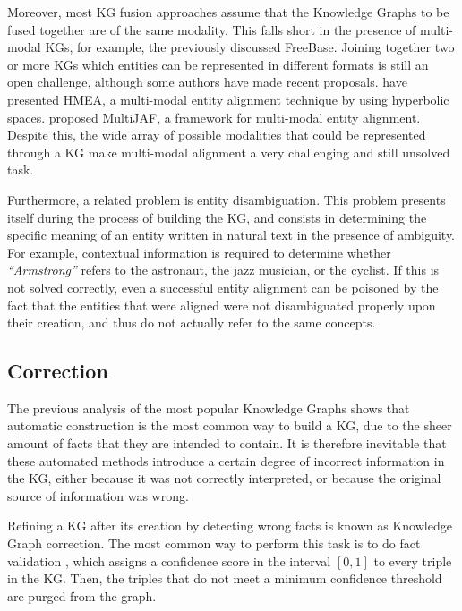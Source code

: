 Moreover, most KG fusion approaches assume that the Knowledge Graphs to be fused together are of the same modality. This falls short in the presence of multi-modal KGs, for example, the previously discussed FreeBase. Joining together two or more KGs which entities can be represented in different formats is still an open challenge, although some authors have made recent proposals. \citet{guo2021} have presented HMEA, a multi-modal entity alignment technique by using hyperbolic spaces. \citet{cheng2022} proposed MultiJAF, a framework for multi-modal entity alignment. Despite this, the wide array of possible modalities that could be represented through a KG make multi-modal alignment a very challenging and still unsolved task.

Furthermore, a related problem is entity disambiguation. This problem presents itself during the process of building the KG, and consists in determining the specific meaning of an entity written in natural text in the presence of ambiguity. For example, contextual information is required to determine whether \textit{``Armstrong''} refers to the astronaut, the jazz musician, or the cyclist. If this is not solved correctly, even a successful entity alignment can be poisoned by the fact that the entities that were aligned were not disambiguated properly upon their creation, and thus do not actually refer to the same concepts.

\subsection{Correction}
The previous analysis of the most popular Knowledge Graphs shows that automatic construction is the most common way to build a KG, due to the sheer amount of facts that they are intended to contain. It is therefore inevitable that these automated methods introduce a certain degree of incorrect information in the KG, either because it was not correctly interpreted, or because the original source of information was wrong.

Refining a KG after its creation by detecting wrong facts is known as Knowledge Graph correction. The most common way to perform this task is to do fact validation \cite{paulheim2017}, which assigns a confidence score in the interval $[0, 1]$ to every triple in the KG. Then, the triples that do not meet a minimum confidence threshold are purged from the graph.

